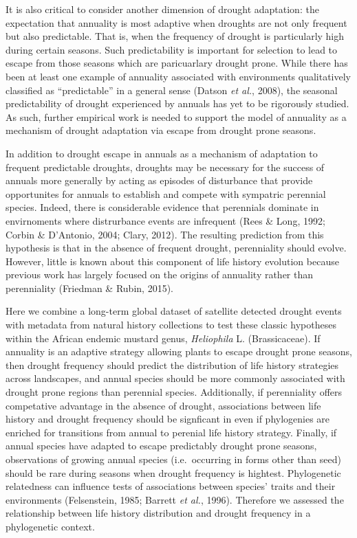 \documentclass[man,floatsintext]{apa6}
\theoremstyle{definition}
\theoremstyle{definition}
\theoremstyle{definition}
\theoremstyle{remark}
\begin{document}
It is also critical to consider another dimension of drought adaptation:
the expectation that annuality is most adaptive when droughts are not
only frequent but also predictable. That is, when the frequency of
drought is particularly high during certain seasons. Such predictability
is important for selection to lead to escape from those seasons which
are paricuarlary drought prone. While there has been at least one
example of annuality associated with environments qualitatively
classified as \enquote{predictable} in a general sense (Datson \emph{et
al.}, 2008), the seasonal predictability of drought experienced by
annuals has yet to be rigorously studied. As such, further empirical
work is needed to support the model of annuality as a mechanism of
drought adaptation via escape from drought prone seasons.

In addition to drought escape in annuals as a mechanism of adaptation to
frequent predictable droughts, droughts may be necessary for the success
of annuals more generally by acting as episodes of disturbance that
provide opportunites for annuals to establish and compete with sympatric
perennial species. Indeed, there is considerable evidence that
perennials dominate in envirnoments where distrurbance events are
infrequent (Rees \& Long, 1992; Corbin \& D'Antonio, 2004; Clary, 2012).
The resulting prediction from this hypothesis is that in the absence of
frequent drought, perenniality should evolve. However, little is known
about this component of life history evolution because previous work has
largely focused on the origins of annuality rather than perenniality
(Friedman \& Rubin, 2015).

Here we combine a long-term global dataset of satellite detected drought
events with metadata from natural history collections to test these
classic hypotheses within the African endemic mustard genus,
\emph{Heliophila} L. (Brassicaceae). If annuality is an adaptive
strategy allowing plants to escape drought prone seasons, then drought
frequency should predict the distribution of life history strategies
across landscapes, and annual species should be more commonly associated
with drought prone regions than perennial species. Additionally, if
perenniality offers competative advantage in the absence of drought,
associations between life history and drought frequency should be
signficant in even if phylogenies are enriched for transitions from
annual to perenial life history strategy. Finally, if annual species
have adapted to escape predictably drought prone seasons, observations
of growing annual species (i.e.~occurring in forms other than seed)
should be rare during seasons when drought frequency is hightest.
Phylogenetic relatedness can influence tests of associations between
species' traits and their environments (Felsenstein, 1985; Barrett
\emph{et al.}, 1996). Therefore we assessed the relationship between
life history distribution and drought frequency in a phylogenetic
context.
\end{document}
